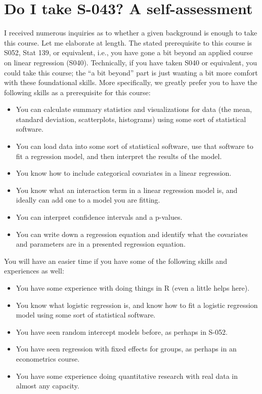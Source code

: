 \documentclass[
  letterpaper,
  DIV=11,
  numbers=noendperiod]{scrreprt}
\begin{document}

\chapter*{Do I take S-043? A
self-assessment}\label{do-i-take-s-043-a-self-assessment}


I received numerous inquiries as to whether a given background is enough
to take this course. Let me elaborate at length. The stated prerequisite
to this course is S052, Stat 139, or equivalent, i.e., you have gone a
bit beyond an applied course on linear regression (S040). Technically,
if you have taken S040 or equivalent, you could take this course; the
``a bit beyond'' part is just wanting a bit more comfort with these
foundational skills. More specifically, we greatly prefer you to have
the following skills as a prerequisite for this course:

\begin{itemize}
\item
  You can calculate summary statistics and visualizations for data (the
  mean, standard deviation, scatterplots, histograms) using some sort of
  statistical software.
\item
  You can load data into some sort of statistical software, use that
  software to fit a regression model, and then interpret the results of
  the model.
\item
  You know how to include categorical covariates in a linear regression.
\item
  You know what an interaction term in a linear regression model is, and
  ideally can add one to a model you are fitting.
\item
  You can interpret confidence intervals and a p-values.
\item
  You can write down a regression equation and identify what the
  covariates and parameters are in a presented regression equation.
\end{itemize}

You will have an easier time if you have some of the following skills
and experiences as well:

\begin{itemize}
\item
  You have some experience with doing things in R (even a little helps
  here).
\item
  You know what logistic regression is, and know how to fit a logistic
  regression model using some sort of statistical software.
\item
  You have seen random intercept models before, as perhaps in S-052.
\item
  You have seen regression with fixed effects for groups, as perhaps in
  an econometrics course.
\item
  You have some experience doing quantitative research with real data in
  almost any capacity.
\end{itemize}
\end{document}
